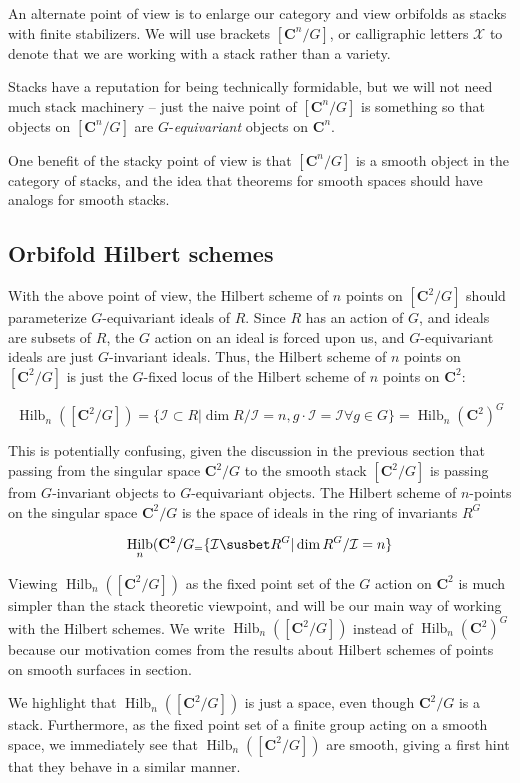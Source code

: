 \documentclass{amsart}[12pt]
\theoremstyle{definition}
\newcommand{\C}{\mathbf{C}}
\DeclareMathOperator{\Hilb}{Hilb}
\begin{document}
An alternate point of view is to enlarge our category and view orbifolds as stacks with finite stabilizers.  We will use brackets $[\C^n/G]$, or calligraphic letters $\mathcal{X}$ to denote that we are working with a stack rather than a variety.  

Stacks have a reputation for being technically formidable, but we will not need much stack machinery -- just the naive point of $[\C^n/G]$ is something so that objects on $[\C^n/G]$ are $G$-\emph{equivariant} objects on $\C^n$.  


One benefit of the stacky point of view is that $[\C^n/G]$ is a smooth object in the category of stacks, and the idea that theorems for smooth spaces should have analogs for smooth stacks.


\subsection{Orbifold Hilbert schemes}

With the above point of view, the Hilbert scheme of $n$ points on $[\C^2/G]$ should parameterize $G$-equivariant ideals of $R$.  Since $R$ has an action of $G$, and ideals are subsets of $R$, the $G$ action on an ideal is forced upon us, and $G$-equivariant ideals are just $G$-invariant ideals.  Thus, the Hilbert scheme of $n$ points on $[\C^2/G]$ is just the $G$-fixed locus of the Hilbert scheme of $n$ points on $\C^2$:

$$\Hilb_n([\C^2/G])=\{\mathcal{I}\subset R |\dim R/\mathcal{I}=n, g\cdot \mathcal{I}=\mathcal{I}\forall g\in G \} =\Hilb_n(\C^2)^G$$

This is potentially confusing, given the discussion in the previous section that passing from the singular space $\C^2/G$ to the smooth stack $[\C^2/G]$ is passing from $G$-invariant objects to $G$-equivariant objects.  The Hilbert scheme of $n$-points on the singular space $\C^2/G$ is the space of ideals in the ring of invariants $R^G$

$$\Hilb_n(\C^2/G_=\{\mathcal{I}\susbet R^G | \dim R^G/\mathcal{I}=n\}$$


Viewing $\Hilb_n([\C^2/G])$ as the fixed point set of the $G$ action on $\C^2$ is much simpler than the stack theoretic viewpoint, and will be our main way of working with the Hilbert schemes.  We write $\Hilb_n([\C^2/G])$ instead of $\Hilb_n(\C^2)^G$ because our motivation comes from the results about Hilbert schemes of points on smooth surfaces in section.


We highlight that $\Hilb_n([\C^2/G])$ is just a space, even though $\C^2/G$ is a stack.  Furthermore, as the fixed point set of a finite group acting on a smooth space, we immediately see that $\Hilb_n([\C^2/G])$ are smooth, giving a first hint that they behave in a similar manner.
\end{document}
